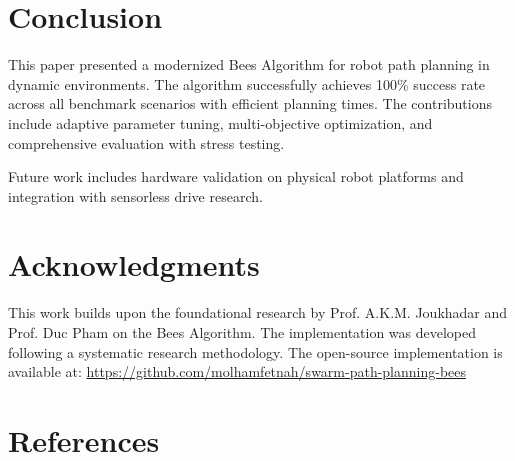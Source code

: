 \documentclass[12pt]{article}
\begin{document}
\section{Conclusion}

This paper presented a modernized Bees Algorithm for robot path planning in dynamic environments. The algorithm successfully achieves 100\% success rate across all benchmark scenarios with efficient planning times. The contributions include adaptive parameter tuning, multi-objective optimization, and comprehensive evaluation with stress testing.

Future work includes hardware validation on physical robot platforms and integration with sensorless drive research.

\section*{Acknowledgments}

This work builds upon the foundational research by Prof. A.K.M. Joukhadar and Prof. Duc Pham on the Bees Algorithm. The implementation was developed following a systematic research methodology. The open-source implementation is available at: \url{https://github.com/molhamfetnah/swarm-path-planning-bees}

\section*{References}



\end{document}
